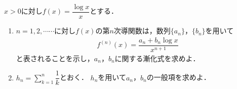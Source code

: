 \documentclass[../../main.tex]{subfiles}
\begin{document}
$x>0$に対し$\displaystyle f(x)=\dfrac{\log x}{x}$とする．
\begin{enumerate}
  \item $n=1,2,\cdots\cdots$に対し$f(x)$の第$n$次導関数は，数列$\{ a_n \}$，$\{ b_n \}$を用いて
    \begin{align*}
      f^{(n)}(x)=\dfrac{a_n+b_n\log x}{x^{n+1}}
    \end{align*}
    と表されることを示し，$a_n$，$b_n$に関する漸化式を求めよ．
  \item $\displaystyle h_n=\sum_{k=1}^n\dfrac{1}{k}$とおく．
    $h_n$を用いて$a_n$，$b_n$の一般項を求めよ．
\end{enumerate}
\end{document}
